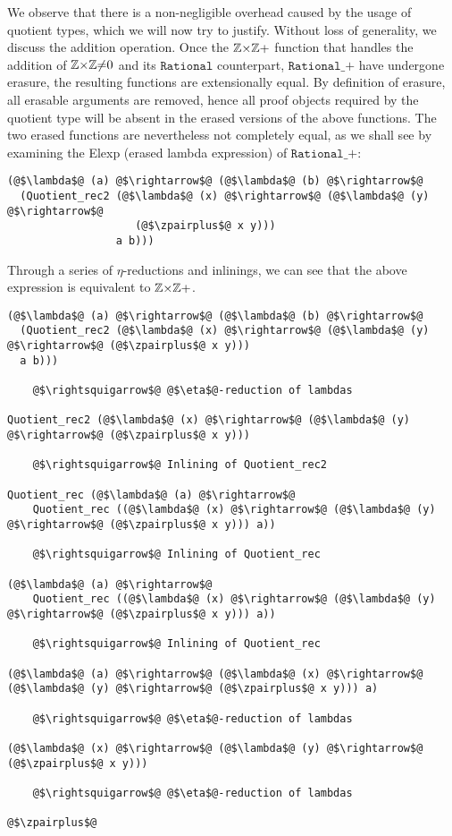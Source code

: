 \documentclass[12pt,twoside,maitrise]{dms}
\theoremstyle{definition}
\numberwithin{equation}{section}
\numberwithin{table}{chapter}
\numberwithin{figure}{chapter}
\newcommand\fn[1] {\texttt{#1}}
\begin{document}
We observe that there is a non-negligible overhead caused by the usage of
quotient types, which we will now try to justify. Without loss of generality, we
discuss the addition operation. Once the $\mathbb{Z}{\times}\mathbb{Z}+$ function that handles the
addition of $\mathbb{Z}{\times}\mathbb{Z}{\ne}0$ and its $\fn{Rational}$ counterpart, $\fn{Rational\_+}$
have undergone erasure, the resulting functions are extensionally equal. By
definition of erasure\cite{monnier2019typer}, all erasable arguments are
removed, hence all proof objects required by the quotient type will be absent in
the erased versions of the above functions. The two erased functions are
nevertheless not completely equal, as we shall see by examining the Elexp
(erased lambda expression)\cite{delaunay2017implementation} of
$\fn{Rational\_+}$:

\begin{verbatim}
(@$\lambda$@ (a) @$\rightarrow$@ (@$\lambda$@ (b) @$\rightarrow$@
  (Quotient_rec2 (@$\lambda$@ (x) @$\rightarrow$@ (@$\lambda$@ (y) @$\rightarrow$@
                    (@$\zpairplus$@ x y)))
                 a b)))
\end{verbatim}

Through a series of $\eta$-reductions and inlinings, we can see that the above
expression is equivalent to $\mathbb{Z}{\times}\mathbb{Z}+$.

\begin{mdframed}
\begin{verbatim}
(@$\lambda$@ (a) @$\rightarrow$@ (@$\lambda$@ (b) @$\rightarrow$@
  (Quotient_rec2 (@$\lambda$@ (x) @$\rightarrow$@ (@$\lambda$@ (y) @$\rightarrow$@ (@$\zpairplus$@ x y)))
  a b)))

    @$\rightsquigarrow$@ @$\eta$@-reduction of lambdas

Quotient_rec2 (@$\lambda$@ (x) @$\rightarrow$@ (@$\lambda$@ (y) @$\rightarrow$@ (@$\zpairplus$@ x y)))

    @$\rightsquigarrow$@ Inlining of Quotient_rec2

Quotient_rec (@$\lambda$@ (a) @$\rightarrow$@
    Quotient_rec ((@$\lambda$@ (x) @$\rightarrow$@ (@$\lambda$@ (y) @$\rightarrow$@ (@$\zpairplus$@ x y))) a))

    @$\rightsquigarrow$@ Inlining of Quotient_rec

(@$\lambda$@ (a) @$\rightarrow$@
    Quotient_rec ((@$\lambda$@ (x) @$\rightarrow$@ (@$\lambda$@ (y) @$\rightarrow$@ (@$\zpairplus$@ x y))) a))

    @$\rightsquigarrow$@ Inlining of Quotient_rec

(@$\lambda$@ (a) @$\rightarrow$@ (@$\lambda$@ (x) @$\rightarrow$@ (@$\lambda$@ (y) @$\rightarrow$@ (@$\zpairplus$@ x y))) a)

    @$\rightsquigarrow$@ @$\eta$@-reduction of lambdas

(@$\lambda$@ (x) @$\rightarrow$@ (@$\lambda$@ (y) @$\rightarrow$@ (@$\zpairplus$@ x y)))

    @$\rightsquigarrow$@ @$\eta$@-reduction of lambdas

@$\zpairplus$@
\end{verbatim}
\end{mdframed}
\end{document}
